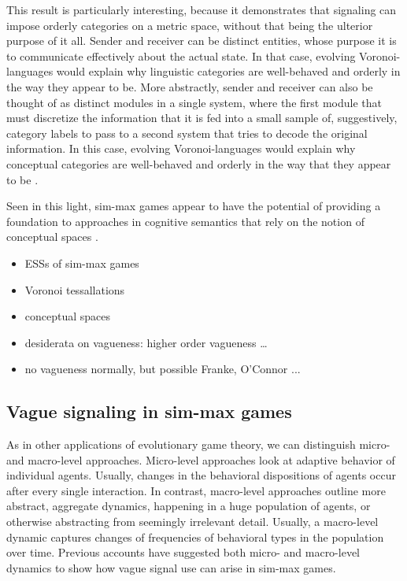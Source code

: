 This result is particularly interesting, because it demonstrates that
signaling can impose orderly categories on a metric space, without
that being the ulterior purpose of it all. Sender and receiver can be
distinct entities, whose purpose it is to communicate effectively
about the actual state. In that case, evolving Voronoi-languages would
explain why linguistic categories are well-behaved and orderly in the
way they appear to be. More abstractly, sender and receiver can also
be thought of as distinct modules in a single system, where the first
module that must discretize the information that it is fed into a
small sample of, suggestively, category labels to pass to a second
system that tries to decode the original information. In this case,
evolving Voronoi-languages would explain why conceptual categories are
well-behaved and orderly in the way that they appear to be
\citep[see][for more on this latter
interpretation]{OConnor2013:Evolving-Percep}.

Seen in this light, sim-max games appear to have the potential of
providing a foundation to approaches in cognitive semantics that rely
on the notion of conceptual spaces
\citep[e.g.][]{Gardenfors2000:Conceptual-Spac}.



\bigskip

\begin{itemize}
\item ESSs of sim-max games
\item Voronoi tessallations
\item conceptual spaces
\item desiderata on vagueness: higher order vagueness \dots
\item no vagueness normally, but possible Franke, O'Connor ...
\end{itemize}

\bigskip

\subsection{Vague signaling in sim-max games}


As in other applications of evolutionary game theory, we can
distinguish micro- and macro-level approaches. Micro-level approaches
look at adaptive behavior of individual agents. Usually, changes in
the behavioral dispositions of agents occur after every single
interaction. In contrast, macro-level approaches outline more
abstract, aggregate dynamics, happening in a huge population of
agents, or otherwise abstracting from seemingly irrelevant
detail. Usually, a macro-level dynamic captures changes of frequencies
of behavioral types in the population over time. Previous accounts
have suggested both micro- and macro-level dynamics to show how vague
signal use can arise in sim-max games.

